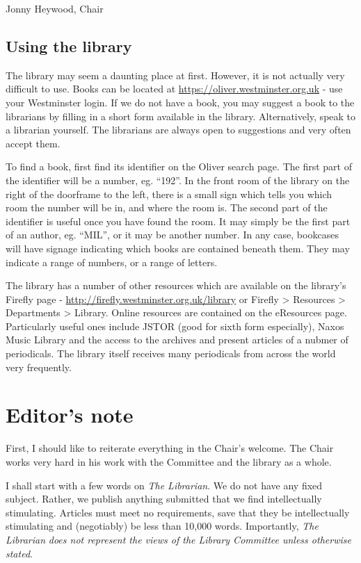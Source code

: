Jonny Heywood, Chair

\subsection{Using the library}

The library may seem a daunting place at first. However, it is not actually very difficult to use. Books can be located at \url{https://oliver.westminster.org.uk} - use your Westminster login. If we do not have a book, you may suggest a book to the librarians by filling in a short form available in the library. Alternatively, speak to a librarian yourself. The librarians are always open to suggestions and very often accept them.

To find a book, first find its identifier on the Oliver search page. The first part of the identifier will be a number, eg. ``192''. In the front room of the library on the right of the doorframe to the left, there is a small sign which tells you which room the number will be in, and where the room is. The second part of the identifier is useful once you have found the room. It may simply be the first part of an author, eg. ``MIL'', or it may be another number. In any case, bookcases will have signage indicating which books are contained beneath them. They may indicate a range of numbers, or a range of letters.

The library has a number of other resources which are available on the library's Firefly page - \url{http://firefly.westminster.org.uk/library} or Firefly > Resources > Departments > Library. Online resources are contained on the eResources page. Particularly useful ones include JSTOR (good for sixth form especially), Naxos Music Library and the access to the archives and present articles of a nubmer of periodicals. The library itself receives many periodicals from across the world very frequently.

\section{Editor's note}

First, I should like to reiterate everything in the Chair's welcome. The Chair works very hard in his work with the Committee and the library as a whole.

I shall start with a few words on \textit{The Librarian}. We do not have any fixed subject. Rather, we publish anything submitted that we find intellectually stimulating. Articles must meet no requirements, save that they be intellectually stimulating and (negotiably) be less than 10,000 words. Importantly, \textit{The Librarian} \textit{does not represent the views of the Library Committee unless otherwise stated}.

